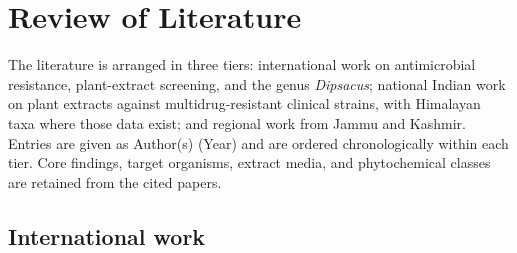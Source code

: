 
\chapter{Review of Literature}
\label{ch:lit_review}

The literature is arranged in three tiers: international work on antimicrobial resistance, plant-extract screening, and the genus \textit{Dipsacus}; national Indian work on plant extracts against multidrug-resistant clinical strains, with Himalayan taxa where those data exist; and regional work from Jammu and Kashmir. Entries are given as Author(s) (Year) and are ordered chronologically within each tier. Core findings, target organisms, extract media, and phytochemical classes are retained from the cited papers.

\section{International work}
\label{sec:lit_international}

